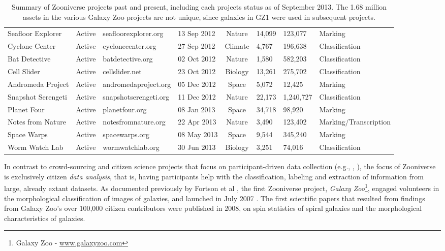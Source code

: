 \documentclass{sigchi}
\begin{document}
\begin{table}
\begin{center}
\begin{tabular}{lcllclll}
Seafloor Explorer & Active & seafloorexplorer.org & 13 Sep 2012 & Nature & 14,099 & 123,077 & Marking \\
Cyclone Center & Active & cyclonecenter.org & 27 Sep 2012 & Climate & 4,767 & 196,638 & Classification \\
Bat Detective & Active & batdetective.org & 02 Oct 2012 & Nature & 1,580 & 582,203 & Classification \\
Cell Slider & Active & cellslider.net & 23 Oct 2012 & Biology & 13,261 & 275,702 & Classification \\
Andromeda Project & Active & andromedaproject.org & 05 Dec 2012 & Space & 5,072 & 12,425 & Marking \\
Snapshot Serengeti & Active & snapshotserengeti.org & 11 Dec 2012 & Nature & 22,173 & 1,240,727 & Classification \\
\hline
Planet Four & Active & planetfour.org & 08 Jan 2013 & Space & 34,718 & 98,920 & Marking \\
Notes from Nature & Active & notesfromnature.org & 22 Apr 2013 & Nature & 3,490 & 123,402 & Marking/Transcription \\
Space Warps & Active & spacewarps.org & 08 May 2013 & Space & 9,544 & 345,240 & Marking \\
Worm Watch Lab & Active & wormwatchlab.org & 30 Jun 2013 & Biology & 3,251 & 74,016 & Classification \\
\hline
\end{tabular}
\normalsize
\label{project-summary}
\caption{Summary of Zooniverse projects past and present, including each projects status as of September 2013.  The 1.68 million assets in the various Galaxy Zoo projects are not unique, since galaxies in GZ1 were used in subsequent projects.}
\end{center}
\end{table}


In contrast to crowd-sourcing and citizen science projects that focus on participant-driven data collection (e.g., \cite{okolloh2009ushahidi}, \cite{zook2010volunteered}), the focus of Zooniverse is exclusively citizen \emph{data analysis}, that is, having participants help with the classification, labeling and extraction of information from large, already extant datasets. As documented previously by Fortson et al \cite{fortson2011galaxy}, the first Zooniverse project, \emph{Galaxy Zoo}\footnote{Galaxy Zoo - \url{www.galaxyzoo.com}}, engaged volunteers in the morphological classification of images of galaxies, and launched in July 2007 \cite{galaxyzoo-launch}.  The first scientific papers that resulted from findings from Galaxy Zoo's over 100,000 citizen contributors were published in 2008, on spin statistics of spiral galaxies\cite{land2008galaxy} and the morphological characteristics of galaxies\cite{lintott2008galaxy}.
\end{document}
